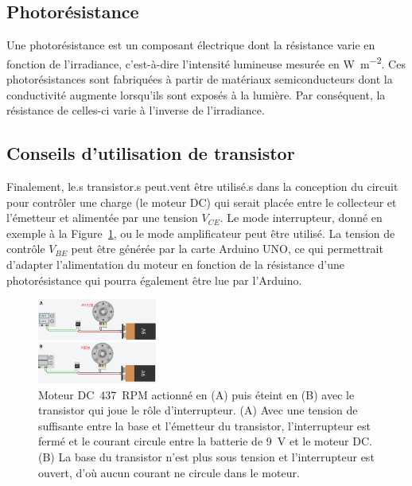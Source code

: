 \documentclass[english,french,12pt]{article}
\begin{document}
\subsection*{Photorésistance}
Une photorésistance est un composant électrique dont la résistance varie en fonction de l'irradiance, c'est-à-dire l’intensité lumineuse mesurée en \si[inter-unit-product=\ensuremath{{}\cdot{}}]{\watt\per\meter\squared}. Ces photorésistances sont fabriquées à partir de matériaux semiconducteurs dont la conductivité augmente lorsqu’ils sont exposés à la lumière. Par conséquent, la résistance de celles-ci varie à l'inverse de l'irradiance. 


\subsection*{Conseils d'utilisation de transistor}
Finalement, le.s transistor.s peut.vent être utilisé.s dans la conception du circuit pour contrôler une charge (le moteur DC) qui serait placée entre le collecteur et l'émetteur et alimentée par une tension $V_{CE}$. Le mode interrupteur, donné en exemple à la Figure~\ref{fig:InterrupteurMoteur}, ou le mode amplificateur peut être utilisé. La tension de contrôle $V_{BE}$ peut être générée par la carte Arduino UNO, ce qui permettrait d’adapter l’alimentation du moteur en fonction de la résistance d’une photorésistance qui pourra également être lue par l’Arduino.

\begin{figure}[h]
    \centering
    \includegraphics[width=0.35\textwidth]{InterrupteurMoteur.png}
    \caption{Moteur DC~437~RPM actionné en (A) puis éteint en (B) avec le transistor qui joue le rôle d'interrupteur. (A) Avec une tension de suffisante entre la base et l'émetteur du transistor, l’interrupteur est fermé et le courant circule entre la batterie de \SI{9}{\volt} et le moteur DC. (B) La base du transistor n'est plus sous tension et l'interrupteur est ouvert, d'où aucun courant ne circule dans le moteur.}
    \label{fig:InterrupteurMoteur}
\end{figure}
\end{document}
